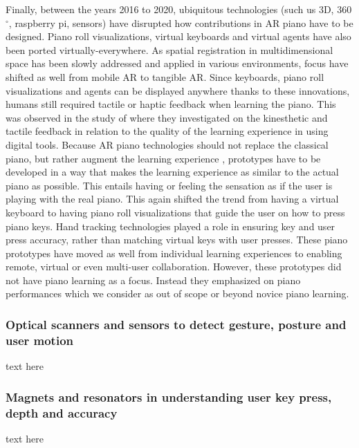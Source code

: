 \documentclass[sigconf, screen, review]{acmart}
\begin{document}
Finally, between the years 2016 to 2020, ubiquitous technologies (such us 3D, 360$^{\circ}$, raspberry pi, sensors) have disrupted how contributions in AR piano have to be designed. Piano roll visualizations, virtual keyboards and virtual agents have also been ported virtually-everywhere. As spatial registration in multidimensional space has been slowly addressed \cite{roberts2011spatial,novotny2013applications, billinghurst2008tangible} and applied in various environments, focus have shifted as well from mobile AR to tangible AR. Since keyboards, piano roll visualizations and agents can be displayed anywhere thanks to these innovations, humans still required tactile or haptic feedback when learning the piano. This was observed in the study of \citet{hamam2013effect} where they investigated on the kinesthetic and tactile feedback in relation to the quality of the learning experience in using digital tools. Because AR piano technologies should not replace the classical piano, but rather augment the learning experience \cite{yang2020modern}, prototypes have to be developed in a way that makes the learning experience as similar to the actual piano as possible. This entails having or feeling the sensation as if the user is playing with the real piano. This again shifted the trend from having a virtual keyboard to having piano roll visualizations that guide the user on how to press piano keys. Hand tracking technologies played a role in ensuring key and user press accuracy, rather than matching virtual keys with user presses. These piano prototypes have moved as well from individual learning experiences to enabling remote, virtual or even multi-user collaboration. However, these prototypes did not have piano learning as a focus. Instead they emphasized on piano performances which we consider as out of scope or beyond novice piano learning. 

\subsubsection{Optical scanners and sensors to detect gesture, posture and user motion}
\label{subsec: gesture}
 text here

\subsubsection{Magnets and resonators in understanding user key press, depth and accuracy}
\label{subsec: magnets}

text here 
\end{document}
